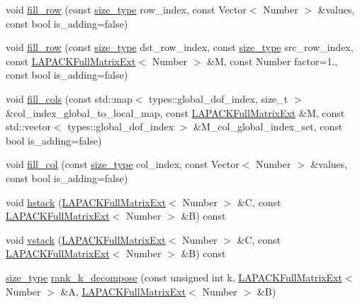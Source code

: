 \begin{DoxyCompactItemize}
\item 
void \hyperlink{classLAPACKFullMatrixExt_a74d566120461e1a2437b9fd9a070633f}{fill\+\_\+row} (const \hyperlink{classLAPACKFullMatrixExt_a5cf5f4a6104dc17029210b5ca52bf574}{size\+\_\+type} row\+\_\+index, const Vector$<$ Number $>$ \&values, const bool is\+\_\+adding=false)
\item 
void \hyperlink{classLAPACKFullMatrixExt_ad4e5746bbd700aac4a9830b8b051bbb3}{fill\+\_\+row} (const \hyperlink{classLAPACKFullMatrixExt_a5cf5f4a6104dc17029210b5ca52bf574}{size\+\_\+type} dst\+\_\+row\+\_\+index, const \hyperlink{classLAPACKFullMatrixExt_a5cf5f4a6104dc17029210b5ca52bf574}{size\+\_\+type} src\+\_\+row\+\_\+index, const \hyperlink{classLAPACKFullMatrixExt}{L\+A\+P\+A\+C\+K\+Full\+Matrix\+Ext}$<$ Number $>$ \&M, const Number factor=1., const bool is\+\_\+adding=false)
\item 
void \hyperlink{classLAPACKFullMatrixExt_af988edbf2f192f0eddf542178755eb91}{fill\+\_\+cols} (const std\+::map$<$ types\+::global\+\_\+dof\+\_\+index, size\+\_\+t $>$ \&col\+\_\+index\+\_\+global\+\_\+to\+\_\+local\+\_\+map, const \hyperlink{classLAPACKFullMatrixExt}{L\+A\+P\+A\+C\+K\+Full\+Matrix\+Ext} \&M, const std\+::vector$<$ types\+::global\+\_\+dof\+\_\+index $>$ \&M\+\_\+col\+\_\+global\+\_\+index\+\_\+set, const bool is\+\_\+adding=false)
\item 
void \hyperlink{classLAPACKFullMatrixExt_a497a2e73b69f5b07cedb729330e95667}{fill\+\_\+col} (const \hyperlink{classLAPACKFullMatrixExt_a5cf5f4a6104dc17029210b5ca52bf574}{size\+\_\+type} col\+\_\+index, const Vector$<$ Number $>$ \&values, const bool is\+\_\+adding=false)
\item 
void \hyperlink{classLAPACKFullMatrixExt_aeeae2d2698007889a47f192043adb75c}{hstack} (\hyperlink{classLAPACKFullMatrixExt}{L\+A\+P\+A\+C\+K\+Full\+Matrix\+Ext}$<$ Number $>$ \&C, const \hyperlink{classLAPACKFullMatrixExt}{L\+A\+P\+A\+C\+K\+Full\+Matrix\+Ext}$<$ Number $>$ \&B) const
\item 
void \hyperlink{classLAPACKFullMatrixExt_a0f315932c3729240d03bc941bb2de849}{vstack} (\hyperlink{classLAPACKFullMatrixExt}{L\+A\+P\+A\+C\+K\+Full\+Matrix\+Ext}$<$ Number $>$ \&C, const \hyperlink{classLAPACKFullMatrixExt}{L\+A\+P\+A\+C\+K\+Full\+Matrix\+Ext}$<$ Number $>$ \&B) const
\item 
\hyperlink{classLAPACKFullMatrixExt_a5cf5f4a6104dc17029210b5ca52bf574}{size\+\_\+type} \hyperlink{classLAPACKFullMatrixExt_ab28877de241a7f5f901fa612c6352ce9}{rank\+\_\+k\+\_\+decompose} (const unsigned int k, \hyperlink{classLAPACKFullMatrixExt}{L\+A\+P\+A\+C\+K\+Full\+Matrix\+Ext}$<$ Number $>$ \&A, \hyperlink{classLAPACKFullMatrixExt}{L\+A\+P\+A\+C\+K\+Full\+Matrix\+Ext}$<$ Number $>$ \&B)

\end{DoxyCompactItemize}
